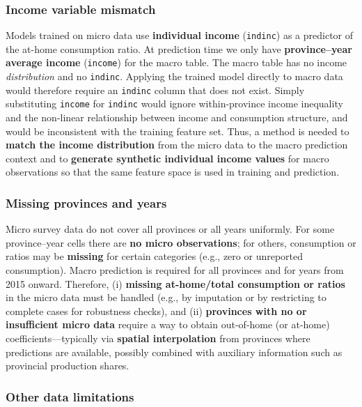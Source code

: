 \subsubsection{Income variable mismatch}
\label{subsec:income-mismatch}

Models trained on micro data use \textbf{individual income} (\texttt{indinc}) as a predictor of the at-home consumption ratio. At prediction time we only have \textbf{province--year average income} (\texttt{income}) for the macro table. The macro table has no income \emph{distribution} and no \texttt{indinc}. Applying the trained model directly to macro data would therefore require an \texttt{indinc} column that does not exist. Simply substituting \texttt{income} for \texttt{indinc} would ignore within-province income inequality and the non-linear relationship between income and consumption structure, and would be inconsistent with the training feature set. Thus, a method is needed to \textbf{match the income distribution} from the micro data to the macro prediction context and to \textbf{generate synthetic individual income values} for macro observations so that the same feature space is used in training and prediction.

\subsubsection{Missing provinces and years}
\label{subsec:missing-provinces}

Micro survey data do not cover all provinces or all years uniformly. For some province--year cells there are \textbf{no micro observations}; for others, consumption or ratios may be \textbf{missing} for certain categories (e.g., zero or unreported consumption). Macro prediction is required for all provinces and for years from 2015 onward. Therefore, (i) \textbf{missing at-home/total consumption or ratios} in the micro data must be handled (e.g., by imputation or by restricting to complete cases for robustness checks), and (ii) \textbf{provinces with no or insufficient micro data} require a way to obtain out-of-home (or at-home) coefficients---typically via \textbf{spatial interpolation} from provinces where predictions are available, possibly combined with auxiliary information such as provincial production shares.

\subsubsection{Other data limitations}
\label{subsec:other-data}

